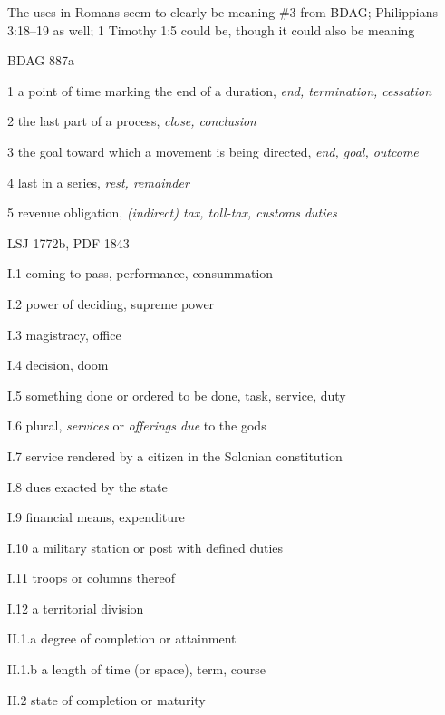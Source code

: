				The uses in Romans seem to clearly be meaning \#3 from BDAG; Philippians 3:18--19 as well; 1 Timothy 1:5 could be, though it could also be meaning 
			
				\begin{compactdesc}
					\item[BDAG 887a] \textbf{}
						\begin{compactitem}
							\item[1] a point of time marking the end of a duration, \textit{end, termination, cessation}
							\item[2] the last part of a process, \textit{close, conclusion}
							\item[3] the goal toward which a movement is being directed, \textit{end, goal, outcome}
							\item[4] last in a series, \textit{rest, remainder}
							\item[5] revenue obligation, \textit{(indirect) tax, toll-tax, customs duties}
						\end{compactitem}
					\item[LSJ 1772b, PDF 1843] \textbf{}
						\begin{compactitem}
							\item[I.1] coming to pass, performance, consummation
							\item[I.2] power of deciding, supreme power
							\item[I.3] magistracy, office
							\item[I.4] decision, doom
							\item[I.5] something done or ordered to be done, task, service, duty
							\item[I.6] plural, \textit{services} or \textit{offerings due} to the gods
							\item[I.7] service rendered by a citizen in the Solonian constitution
							\item[I.8] dues exacted by the state
							\item[I.9] financial means, expenditure
							\item[I.10] a military station or post with defined duties
							\item[I.11] troops or columns thereof
							\item[I.12] a territorial division
							\item[II.1.a] degree of completion or attainment
							\item[II.1.b] a length of time (or space), term, course
							\item[II.2] state of completion or maturity

\end{compactitem}
\end{compactdesc}

